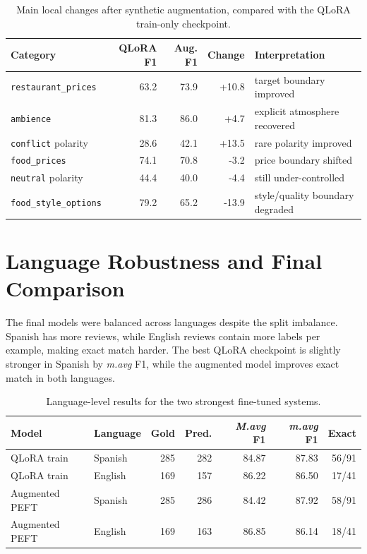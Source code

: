 \documentclass[11pt,a4paper]{article}
\newcommand{\mavg}{\textit{m.avg}}
\newcommand{\Mavg}{\textit{M.avg}}
\newcommand{\code}[1]{\texttt{#1}}
\begin{document}
\begin{table}[H]
    \centering
    \small
    \setlength{\tabcolsep}{5pt}
    \caption{Main local changes after synthetic augmentation, compared with the QLoRA train-only checkpoint.}
    \label{tab:synthetic_deltas}
    \begin{tabular}{@{}lrrrl@{}}
        \toprule
        Category & QLoRA F1 & Aug. F1 & Change & Interpretation \\
        \midrule
        \code{restaurant\_prices} & 63.2 & 73.9 & +10.8 & target boundary improved \\
        \code{ambience} & 81.3 & 86.0 & +4.7 & explicit atmosphere recovered \\
        \code{conflict} polarity & 28.6 & 42.1 & +13.5 & rare polarity improved \\
        \code{food\_prices} & 74.1 & 70.8 & -3.2 & price boundary shifted \\
        \code{neutral} polarity & 44.4 & 40.0 & -4.4 & still under-controlled \\
        \code{food\_style\_options} & 79.2 & 65.2 & -13.9 & style/quality boundary degraded \\
        \bottomrule
    \end{tabular}
\end{table}

\section{Language Robustness and Final Comparison}

The final models were balanced across languages despite the split imbalance. Spanish has more reviews, while English reviews contain more labels per example, making exact match harder. The best QLoRA checkpoint is slightly stronger in Spanish by \mavg{} F1, while the augmented model improves exact match in both languages.

\begin{table}[H]
    \centering
    \small
    \setlength{\tabcolsep}{4pt}
    \caption{Language-level results for the two strongest fine-tuned systems.}
    \label{tab:language}
    \begin{tabular}{@{}llrrrrr@{}}
        \toprule
        Model & Language & Gold & Pred. & \Mavg{} F1 & \mavg{} F1 & Exact \\
        \midrule
        QLoRA train & Spanish & 285 & 282 & 84.87 & 87.83 & 56/91 \\
        QLoRA train & English & 169 & 157 & 86.22 & 86.50 & 17/41 \\
        Augmented PEFT & Spanish & 285 & 286 & 84.42 & 87.92 & 58/91 \\
        Augmented PEFT & English & 169 & 163 & 86.85 & 86.14 & 18/41 \\
        \bottomrule
    \end{tabular}
\end{table}
\end{document}
